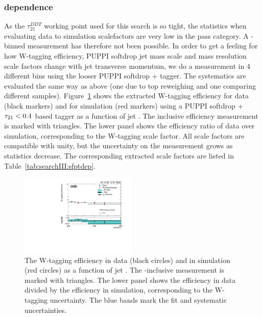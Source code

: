 \subsubsection{\PT dependence}
As the $\tau_{21}^{DDT}$ working point used for this search is so tight, the statistics when evaluating data to simulation scalefactors are very low in the pass category. A \PT-binned measurement has therefore not been possible. In order to get a feeling for how W-tagging efficiency, PUPPI softdrop jet mass scale and mass resolution scale factors change with jet transverse momentum, we do a measurement in 4 different \PT bins using the looser PUPPI softdrop + \nsubj tagger. The systematics are evaluated the same way as above (one due to top \PT reweighing and one comparing different \ttbar samples). Figure~\ref{fig:searchIII:sfvspt} shows the extracted W-tagging efficiency for data (black markers) and for simulation (red markers) using a PUPPI softdrop + $\tau_{21}<0.4$ based tagger as a function of jet \PT. The inclusive efficiency measurement is marked with triangles. The lower panel shows the efficiency ratio of data over simulation, corresponding to the W-tagging scale factor. All scale factors are compatible with unity, but the uncertainty on the measurement grows as statistics decrease. The corresponding extracted scale factors are listed in Table~\ref{tab:searchIII:sfptdep}.
 \begin{figure}[h!]
 \centering
 \includegraphics[width=0.49\textwidth]{figures/vtagging/2017_sf/sd_vPt.pdf}
 \caption{The W-tagging efficiency in data (black circles) and in simulation (red circles) as a function of jet \PT. The \PT-inclusive measurement is marked with triangles. The lower panel shows the efficiency in data divided by the efficiency in simulation, corresponding to the W-tagging uncertainty. The blue bands mark the fit and systematic uncertainties.}
 \label{fig:searchIII:sfvspt}
 \end{figure}

